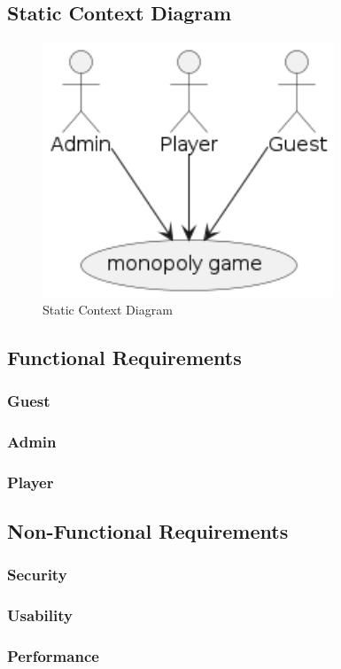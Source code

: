 \documentclass{article}
\begin{document}
\subsection{Static Context Diagram}
 \begin{figure}[H]
	 \centering
	 \includegraphics[height=3in]{../thesis_tex/assets/diagrams/SCD.png}
	 \caption{Static Context Diagram}
\end{figure}

\subsection{Functional Requirements}
\subsubsection{Guest}
\subsubsection{Admin}
\subsubsection{Player}

\subsection{Non-Functional Requirements}
\subsubsection{Security}
\subsubsection{Usability}
\subsubsection{Performance}
\end{document}
